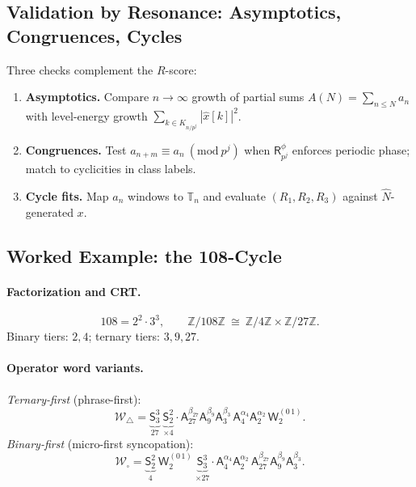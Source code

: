 \documentclass[12pt]{article}
\numberwithin{equation}{section}
\theoremstyle{plain}
\theoremstyle{definition}
\theoremstyle{remark}
\begin{document}
\subsection*{Validation by Resonance: Asymptotics, Congruences, Cycles}
Three checks complement the $R$-score:
\begin{enumerate}
  \item \textbf{Asymptotics.} Compare $n\to\infty$ growth of partial sums $A(N)=\sum_{n\le N} a_n$ with level-energy growth $\sum_{k\in K_{n/p^j}}|\widehat{x}[k]|^2$.
  \item \textbf{Congruences.} Test $a_{n+m}\equiv a_n\ (\mathrm{mod}\ p^j)$ when $\mathsf{R}_{p^j}^{\phi}$ enforces periodic phase; match to cyclicities in class labels.
  \item \textbf{Cycle fits.} Map $a_n$ windows to $\mathbb{T}_n$ and evaluate $(R_1,R_2,R_3)$ against $\widehat{N}$-generated $x$.
\end{enumerate}

\subsection*{Worked Example: the 108-Cycle}
\paragraph{Factorization and CRT.}
\[
108=2^{2}\cdot 3^{3},\qquad \mathbb{Z}/108\mathbb{Z}\ \cong\ \mathbb{Z}/4\mathbb{Z}\times \mathbb{Z}/27\mathbb{Z}.
\]
Binary tiers: $2,4$; ternary tiers: $3,9,27$.

\paragraph{Operator word variants.}
\emph{Ternary-first} (phrase-first):
\[
\mathcal{W}_{\triangle}=\underbrace{\mathsf{S}_3^3}_{27}\ \underbrace{\mathsf{S}_2^2}_{\times 4}\cdot
\mathsf{A}_{27}^{\beta_{27}}\mathsf{A}_{9}^{\beta_{9}}\mathsf{A}_{3}^{\beta_{3}}\,
\mathsf{A}_{4}^{\alpha_{4}}\mathsf{A}_{2}^{\alpha_{2}}\,\mathsf{W}_2^{(0\,1)}.
\]
\emph{Binary-first} (micro-first syncopation):
\[
\mathcal{W}_{\square}=\underbrace{\mathsf{S}_2^2}_{4}\ \mathsf{W}_2^{(0\,1)}\ \underbrace{\mathsf{S}_3^3}_{\times 27}\cdot
\mathsf{A}_{4}^{\alpha_{4}}\mathsf{A}_{2}^{\alpha_{2}}\,
\mathsf{A}_{27}^{\beta_{27}}\mathsf{A}_{9}^{\beta_{9}}\mathsf{A}_{3}^{\beta_{3}}.
\]
\end{document}
